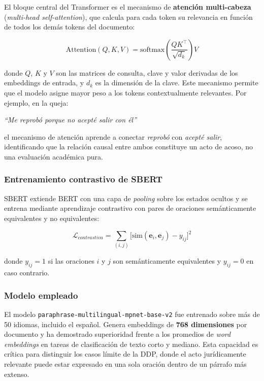 El bloque central del Transformer es el mecanismo de \textbf{atención
multi-cabeza} (\textit{multi-head self-attention}), que calcula para cada token
su relevancia en función de todos los demás tokens del documento:

\begin{equation}
  \text{Attention}(Q, K, V)
  = \text{softmax}\!\left(\frac{QK^\top}{\sqrt{d_k}}\right) V
  \label{eq:attention}
\end{equation}

donde $Q$, $K$ y $V$ son las matrices de consulta, clave y valor derivadas
de los embeddings de entrada, y $d_k$ es la dimensión de la clave.\cite{vaswani2017} Este
mecanismo permite que el modelo asigne mayor peso a los tokens contextualmente
relevantes. Por ejemplo, en la queja:

\begin{center}
  \textit{``Me reprobó porque no acepté salir con él''}
\end{center}

\noindent el mecanismo de atención aprende a conectar \textit{reprobó} con
\textit{acepté salir}, identificando que la relación causal entre ambos
constituye un acto de acoso, no una evaluación académica pura.

\subsubsection*{Entrenamiento contrastivo de SBERT}

SBERT extiende BERT con una capa de \textit{pooling} sobre los estados ocultos
y se entrena mediante aprendizaje contrastivo con pares de oraciones
semánticamente equivalentes y no equivalentes:

\begin{equation}
  \mathcal{L}_{contrastiva}
  = \sum_{(i,j)} \bigl[\text{sim}(\mathbf{e}_i, \mathbf{e}_j) - y_{ij}\bigr]^2
  \label{eq:contrastiva}
\end{equation}

donde $y_{ij} = 1$ si las oraciones $i$ y $j$ son semánticamente equivalentes
y $y_{ij} = 0$ en caso contrario.

\subsubsection*{Modelo empleado}

El modelo \texttt{paraphrase-multilingual-mpnet-base-v2} fue entrenado sobre
más de 50 idiomas, incluido el español. Genera embeddings de \textbf{768
dimensiones} por documento \cite{huggingface2023} y ha demostrado superioridad frente a los promedios
de \textit{word embeddings} en tareas de clasificación de texto corto y mediano.
Esta capacidad es crítica para distinguir los casos límite de la DDP, donde
el acto jurídicamente relevante puede estar expresado en una sola oración dentro
de un párrafo más extenso.


